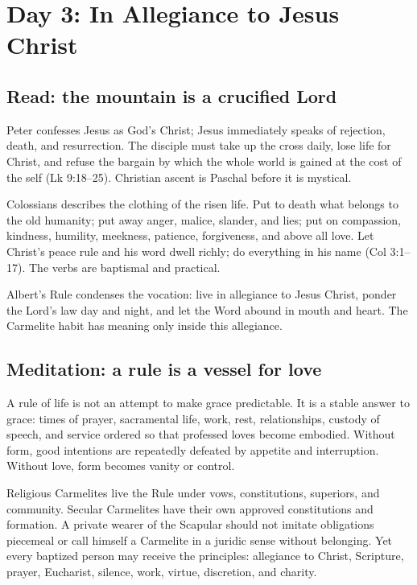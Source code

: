 \section{Day 3: In Allegiance to Jesus Christ}


\subsection{Read: the mountain is a crucified Lord}

Peter confesses Jesus as God's Christ; Jesus immediately speaks of rejection, death, and resurrection. The disciple must take up the cross daily, lose life for Christ, and refuse the bargain by which the whole world is gained at the cost of the self (Lk 9:18--25). Christian ascent is Paschal before it is mystical.

Colossians describes the clothing of the risen life. Put to death what belongs to the old humanity; put away anger, malice, slander, and lies; put on compassion, kindness, humility, meekness, patience, forgiveness, and above all love. Let Christ's peace rule and his word dwell richly; do everything in his name (Col 3:1--17). The verbs are baptismal and practical.

Albert's Rule condenses the vocation: live in allegiance to Jesus Christ, ponder the Lord's law day and night, and let the Word abound in mouth and heart. The Carmelite habit has meaning only inside this allegiance.

\subsection{Meditation: a rule is a vessel for love}

A rule of life is not an attempt to make grace predictable. It is a stable answer to grace: times of prayer, sacramental life, work, rest, relationships, custody of speech, and service ordered so that professed loves become embodied. Without form, good intentions are repeatedly defeated by appetite and interruption. Without love, form becomes vanity or control.

Religious Carmelites live the Rule under vows, constitutions, superiors, and community. Secular Carmelites have their own approved constitutions and formation. A private wearer of the Scapular should not imitate obligations piecemeal or call himself a Carmelite in a juridic sense without belonging. Yet every baptized person may receive the principles: allegiance to Christ, Scripture, prayer, Eucharist, silence, work, virtue, discretion, and charity.


